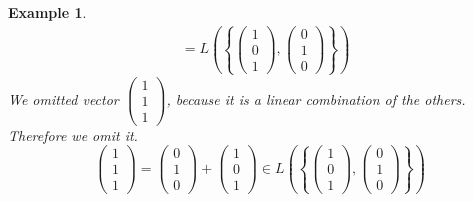 \documentclass[a4paper,landscape,twocolumn]{article}
\newcommand\set[1]{\left\{#1\right\}}
\newtheorem{ex}{Example}[section]
\begin{document}
\begin{ex}
\begin{align*}
    &= L\left(\set{\begin{pmatrix} 1 \\ 0 \\ 1 \end{pmatrix}, \begin{pmatrix} 0 \\ 1 \\ 0 \end{pmatrix}}\right)
  \end{align*}
  We omitted vector $\begin{pmatrix} 1 \\ 1 \\ 1 \end{pmatrix}$, because it is a linear combination of the others.
  Therefore we omit it.
  \[
      \begin{pmatrix} 1 \\ 1 \\ 1 \end{pmatrix} =
      \begin{pmatrix} 0 \\ 1 \\ 0 \end{pmatrix} +
      \begin{pmatrix} 1 \\ 0 \\ 1 \end{pmatrix} \in
      L\left(\set{\begin{pmatrix} 1 \\ 0 \\ 1 \end{pmatrix}, \begin{pmatrix} 0 \\ 1 \\ 0 \end{pmatrix}}\right)
  \]
\end{ex}
\end{document}
